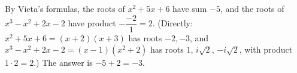 By Vieta's formulas, the roots of $x^2+5x+6$ have sum $-5$, and the roots of $x^3-x^2+2x-2$ have product $-\dfrac{-2}{1}=2$. (Directly: $x^2+5x+6=(x+2)(x+3)$ has roots $-2,-3$, and $x^3-x^2+2x-2=(x-1)(x^2+2)$ has roots $1$, $i\sqrt2$, $-i\sqrt2$, with product $1\cdot2=2$.) The answer is $-5+2=\boxed{-3}$.
